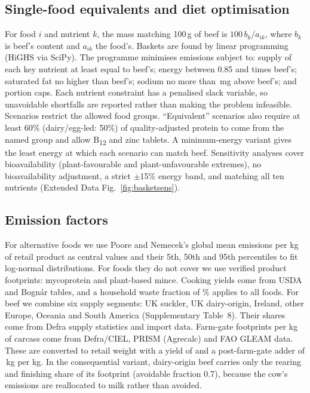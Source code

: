 \documentclass[10pt]{article}
\begin{document}
\subsection{Single-food equivalents and diet optimisation}
For food $i$ and nutrient $k$, the mass matching 100\,g of beef is $100\,b_k/a_{ik}$, where $b_k$ is beef's
content and $a_{ik}$ the food's. Baskets are found by linear programming (HiGHS via SciPy). The
programme minimises emissions subject to: supply of each key nutrient at least equal to beef's; energy
between 0.85 and \LpEnergyMaxRatio{} times beef's; saturated fat no higher than beef's; sodium no more than
\LpSodiumAllow{}\,mg above beef's; and portion caps. Each nutrient constraint has a penalised slack
variable, so unavoidable shortfalls are reported rather than making the problem infeasible. Scenarios
restrict the allowed food groups. ``Equivalent'' scenarios also require at least 60\% (dairy/egg-led:
50\%) of quality-adjusted protein to come from the named group and allow B\textsubscript{12} and zinc tablets.
A minimum-energy variant gives the least energy at which each scenario can match beef. Sensitivity
analyses cover bioavailability (plant-favourable and plant-unfavourable extremes), no bioavailability
adjustment, a strict $\pm$15\% energy band, and matching all ten nutrients (Extended Data Fig.~\ref{fig:basketsens}).

\subsection{Emission factors}
For alternative foods we use Poore and Nemecek's global mean emissions per kg of retail product as
central values and their 5th, 50th and 95th percentiles to fit log-normal distributions\cite{poore2018}.
For foods they do not cover we use verified product footprints: mycoprotein\cite{quorn2024} and
plant-based mince\cite{heller2018,gfi2021}. Cooking yields come from USDA and Bognár tables\cite{showell2012,bognar2002},
and a household waste fraction of \WastePct\% applies to all foods\cite{defra2010waste}. For beef we combine
six supply segments: UK suckler, UK dairy-origin, Ireland, other Europe, Oceania and South America
(Supplementary Table~8). Their shares come from Defra supply statistics and import data\cite{defra2025auk}.
Farm-gate footprints per kg of carcass come from Defra/CIEL, PRISM (Agrecalc) and FAO GLEAM data\cite{ciel2020,prism2024,gerber2013}.
These are converted to retail weight with a yield of \RetailYield{} and a post-farm-gate adder of
\PostFarm{}\,kg \COtwoe{} per kg. In the consequential variant, dairy-origin beef carries only the rearing
and finishing share of its footprint (avoidable fraction 0.7), because the cow's emissions are
reallocated to milk rather than avoided\cite{ekvall2004}.
\end{document}
